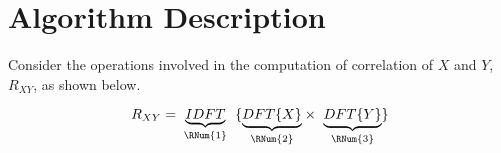 \section{Algorithm Description}




Consider the operations involved in the computation of correlation of $X$ and $Y$, $R_{XY}$, as shown below.

\[  R_{XY} = \underset{\text{ \RNum{1} } } {\underbrace{IDFT}} \ \{ \underset{\text{ \RNum{2} } }{\underbrace{DFT\{ X \} } }  \times \ \underset{\text{ \RNum{3} } }{\underbrace{DFT\{ Y \} } }  \}  \]

